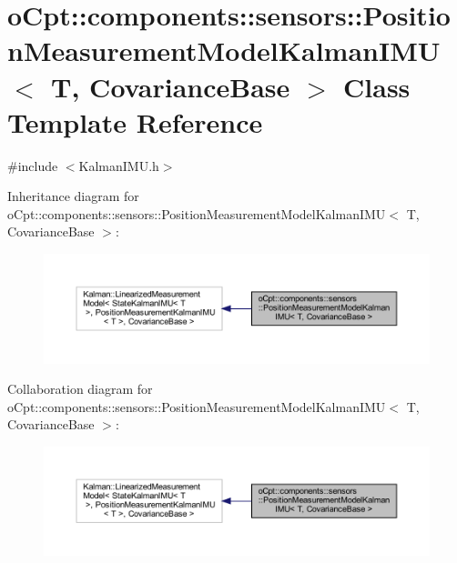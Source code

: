 \hypertarget{classo_cpt_1_1components_1_1sensors_1_1_position_measurement_model_kalman_i_m_u}{}\section{o\+Cpt\+:\+:components\+:\+:sensors\+:\+:Position\+Measurement\+Model\+Kalman\+I\+MU$<$ T, Covariance\+Base $>$ Class Template Reference}
\label{classo_cpt_1_1components_1_1sensors_1_1_position_measurement_model_kalman_i_m_u}


{\ttfamily \#include $<$Kalman\+I\+M\+U.\+h$>$}



Inheritance diagram for o\+Cpt\+:\+:components\+:\+:sensors\+:\+:Position\+Measurement\+Model\+Kalman\+I\+MU$<$ T, Covariance\+Base $>$\+:
\nopagebreak
\begin{figure}[H]
\begin{center}
\leavevmode
\includegraphics[width=350pt]{classo_cpt_1_1components_1_1sensors_1_1_position_measurement_model_kalman_i_m_u__inherit__graph}
\end{center}
\end{figure}


Collaboration diagram for o\+Cpt\+:\+:components\+:\+:sensors\+:\+:Position\+Measurement\+Model\+Kalman\+I\+MU$<$ T, Covariance\+Base $>$\+:
\nopagebreak
\begin{figure}[H]
\begin{center}
\leavevmode
\includegraphics[width=350pt]{classo_cpt_1_1components_1_1sensors_1_1_position_measurement_model_kalman_i_m_u__coll__graph}
\end{center}
\end{figure}
